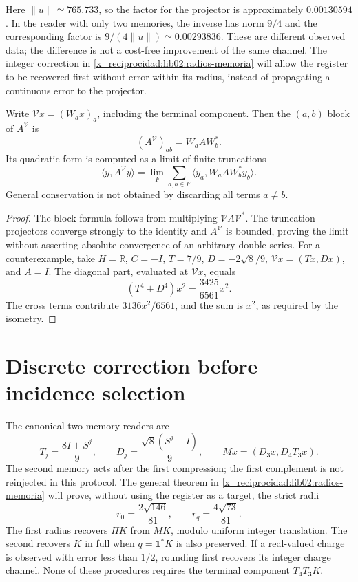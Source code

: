 Here \(\|u\|\simeq765.733\), so the factor for the projector is approximately \(0.00130594\). In the reader with only two memories, the inverse has norm \(9/4\) and the corresponding factor is \(9/(4\|u\|)\simeq0.00293836\). These are different observed data; the difference is not a cost-free improvement of the same channel. The integer correction in \cref{x_reciprocidad:lib02:radios-memoria} will allow the register to be recovered first without error within its radius, instead of propagating a continuous error to the projector.

\begin{proposition}
\label{x_reciprocidad:lib01:correlaciones}
Write \(\mathcal Vx=(W_ax)_a\), including the terminal component. Then the \((a,b)\) block of \(A^{\mathcal V}\) is
\[
 (A^{\mathcal V})_{ab}=W_aAW_b^*.
\]
Its quadratic form is computed as a limit of finite truncations
\[
 \langle y,A^{\mathcal V}y\rangle
 =\lim_F\sum_{a,b\in F}\langle y_a,W_aAW_b^*y_b\rangle.
\]
General conservation is not obtained by discarding all terms \(a\ne b\).
\end{proposition}
\begin{proof}
The block formula follows from multiplying \(\mathcal VA\mathcal V^*\). The truncation projectors converge strongly to the identity and \(A^{\mathcal V}\) is bounded, proving the limit without asserting absolute convergence of an arbitrary double series. For a counterexample, take \(H=\mathbb R\), \(C=-I\), \(T=7/9\), \(D=-2\sqrt8/9\), \(\mathcal Vx=(Tx,Dx)\), and \(A=I\). The diagonal part, evaluated at \(\mathcal Vx\), equals
\[
 (T^4+D^4)x^2=\frac{3425}{6561}x^2.
\]
The cross terms contribute \(3136x^2/6561\), and the sum is \(x^2\), as required by the isometry.
\end{proof}

\section{Discrete correction before incidence selection}
\label{x_reciprocidad:lib01:correccion-incidencia}

The canonical two-memory readers are
\[
 T_j=\frac{8I+S^j}{9},\qquad
 D_j=\frac{\sqrt8(S^j-I)}9,\qquad
 Mx=(D_3x,D_4T_3x).
\]
The second memory acts after the first compression; the first complement is not reinjected in this protocol. The general theorem in \cref{x_reciprocidad:lib02:radios-memoria} will prove, without using the register as a target, the strict radii
\[
 r_0=\frac{2\sqrt{146}}{81},\qquad
 r_q=\frac{4\sqrt{73}}{81}.
\]
The first radius recovers \(\Pi K\) from \(MK\), modulo uniform integer translation. The second recovers \(K\) in full when \(q=\mathbf1^*K\) is also preserved. If a real-valued charge is observed with error less than \(1/2\), rounding first recovers its integer charge channel. None of these procedures requires the terminal component \(T_4T_3K\).

